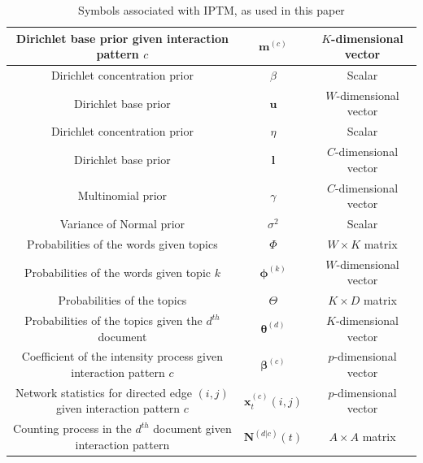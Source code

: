 \documentclass[a4paper]{article}
\begin{document}
\begin{table}[ht]
{\begin{tabular}{ |c|c|c|}
  			\hline	
  			Dirichlet base prior given interaction pattern $c$&$\boldsymbol{m}^{(c)}$ & $K$-dimensional vector \\
  			\hline			
  			Dirichlet concentration prior&$\beta$ & Scalar \\
  			\hline			 
  			Dirichlet base prior&$\boldsymbol{u}$ & $W$-dimensional vector  \\
  			\hline				 	
  			Dirichlet concentration prior&$\eta$ & Scalar \\
  			\hline		
  			Dirichlet base prior&$\boldsymbol{l}$ & $C$-dimensional vector  \\
  			\hline			
  			Multinomial prior&$\gamma$ & $C$-dimensional vector \\
  			\hline
  			Variance of Normal prior&$\sigma^2$ & Scalar \\
  			\hline		
  			Probabilities of the words given topics &$\Phi$ & $W \times K$ matrix \\
  			\hline		
  			Probabilities of the words given topic $k$ &$\boldsymbol{\phi}^{(k)}$ & $W$-dimensional vector\\
  			\hline
  			Probabilities of the topics &$\Theta$ & $K \times D$ matrix \\
  			\hline		
  			Probabilities of the topics given the $d^{th}$ document &$\boldsymbol{\theta}^{(d)}$ & $K$-dimensional vector\\
  			\hline		
  			Coefficient of the intensity process given interaction pattern $c$ &$\boldsymbol{\beta}^{(c)}$ & $p$-dimensional vector\\
  			\hline		
  			Network statistics for directed edge $(i, j)$ given interaction pattern $c$ &$\boldsymbol{x}^{(c)}_t{(i,j)}$ & $p$-dimensional vector\\
  			\hline		
  			Counting process in the $d^{th}$ document given interaction pattern &	$\mathbf{N}^{(d|c)}(t)$ & $A\times A$ matrix\\
  			\hline
  			\hline
  		\end{tabular}}
  		\caption {Symbols associated with IPTM, as used in this paper}
  		\label{table:SymbolsIPTM}
  	\end{table}
  	\normalsize
\end{document}
